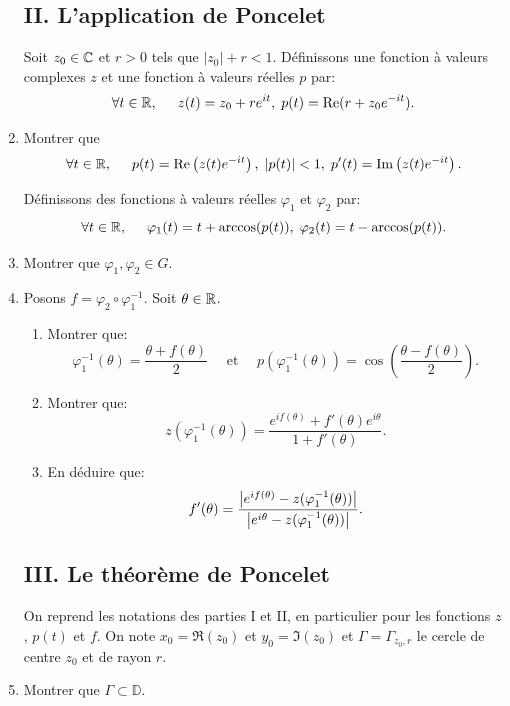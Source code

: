 \begin{enumerate}
\subsection*{II. L'application de Poncelet}
Soit $z_{0}\in \mathbb{C}$ et $r > 0$ tels que $|z_0| + r <1$. Définissons une fonction à valeurs complexes $z$ et une fonction à valeurs réelles $p$ par:
\[
  \forall t \in \mathbb{R},\hspace{0.5cm} z(t) = z_0 + re^{it}, \; p(t) = \operatorname{Re}(r + z_0 e^{-it}).
\]

\item Montrer que 
\[
  \forall t \in \mathbb{R},\hspace{0.5cm} p(t) = \operatorname{Re}\left( z(t)e^{-it}\right), \; |p(t)| < 1, \; p'(t) = \operatorname{Im} \left( z(t)e^{-it} \right).
\]

Définissons des fonctions à valeurs réelles $\varphi_1$ et $\varphi_2$ par:
\[
  \forall t \in \mathbb{R},\hspace{0.5cm} \varphi_{1}(t) = t + \arccos(p(t)), \; \varphi_{2}(t) = t - \arccos(p(t)).
\]

\item Montrer que $\varphi_{1}, \varphi_{2}\in G$.

\item Posons $f = \varphi_{2}\circ \varphi_{1}^{-1}$. Soit $\theta \in \mathbb{R}$.
\begin{enumerate}
 \item Montrer que: 
 \[ \varphi_{1}^{-1}(\theta) = \frac{\theta + f(\theta)}{2} \quad \text{ et } \quad p(\varphi_{1}^{-1}(\theta)) = \cos\left ( \frac{\theta - f(\theta)}{2}\right ).\]
 \item Montrer que:
 \[ z(\varphi_{1}^{-1}(\theta)) = \frac{e^{if(\theta)} + f'(\theta)e^{i\theta}}{1+f'(\theta)}.\]
 \item En déduire que:
 \[ f'(\theta) = \frac{\left\vert e^{if(\theta)} - z(\varphi_{1}^{-1}(\theta))\right\vert}{\left\vert e^{i\theta} - z(\varphi_{1}^{-1}(\theta))\right\vert}.\]
\end{enumerate}

\subsection*{III. Le théorème de Poncelet}
On reprend les notations des parties I et II, en particulier pour les fonctions $z$, $p(t)$ et $f$. On note $x_{0} = \Re(z_0)$ et $y_{0} = \Im(z_0)$ et $\Gamma = \Gamma_{z_{0}, r}$ le cercle de centre $z_0$ et de rayon $r$.

\item Montrer que $\Gamma \subset \mathbb{D}$.


\end{enumerate}
